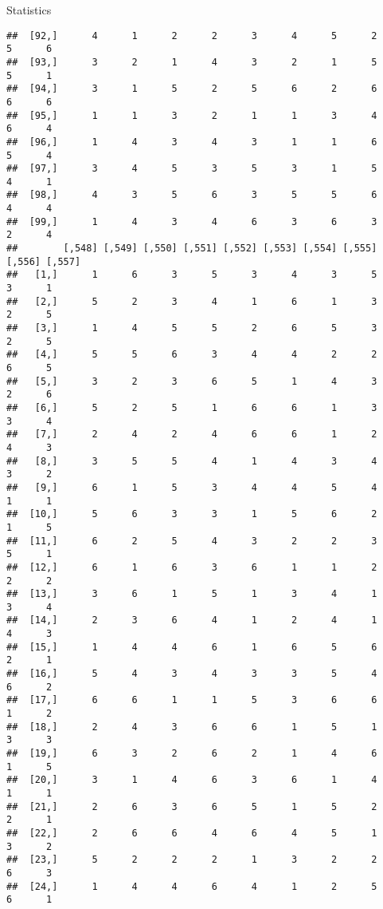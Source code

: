 \documentclass[
  ignorenonframetext,
]{beamer}
\begin{document}
\begin{frame}[fragile]{Statistics}
\begin{verbatim}
##  [92,]      4      1      2      2      3      4      5      2      5      6
##  [93,]      3      2      1      4      3      2      1      5      5      1
##  [94,]      3      1      5      2      5      6      2      6      6      6
##  [95,]      1      1      3      2      1      1      3      4      6      4
##  [96,]      1      4      3      4      3      1      1      6      5      4
##  [97,]      3      4      5      3      5      3      1      5      4      1
##  [98,]      4      3      5      6      3      5      5      6      4      4
##  [99,]      1      4      3      4      6      3      6      3      2      4
##        [,548] [,549] [,550] [,551] [,552] [,553] [,554] [,555] [,556] [,557]
##   [1,]      1      6      3      5      3      4      3      5      3      1
##   [2,]      5      2      3      4      1      6      1      3      2      5
##   [3,]      1      4      5      5      2      6      5      3      2      5
##   [4,]      5      5      6      3      4      4      2      2      6      5
##   [5,]      3      2      3      6      5      1      4      3      2      6
##   [6,]      5      2      5      1      6      6      1      3      3      4
##   [7,]      2      4      2      4      6      6      1      2      4      3
##   [8,]      3      5      5      4      1      4      3      4      3      2
##   [9,]      6      1      5      3      4      4      5      4      1      1
##  [10,]      5      6      3      3      1      5      6      2      1      5
##  [11,]      6      2      5      4      3      2      2      3      5      1
##  [12,]      6      1      6      3      6      1      1      2      2      2
##  [13,]      3      6      1      5      1      3      4      1      3      4
##  [14,]      2      3      6      4      1      2      4      1      4      3
##  [15,]      1      4      4      6      1      6      5      6      2      1
##  [16,]      5      4      3      4      3      3      5      4      6      2
##  [17,]      6      6      1      1      5      3      6      6      1      2
##  [18,]      2      4      3      6      6      1      5      1      3      3
##  [19,]      6      3      2      6      2      1      4      6      1      5
##  [20,]      3      1      4      6      3      6      1      4      1      1
##  [21,]      2      6      3      6      5      1      5      2      2      1
##  [22,]      2      6      6      4      6      4      5      1      3      2
##  [23,]      5      2      2      2      1      3      2      2      6      3
##  [24,]      1      4      4      6      4      1      2      5      6      1

\end{verbatim}
\end{frame}
\end{document}
